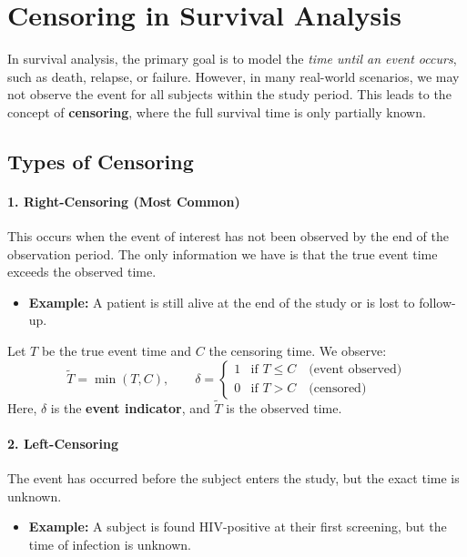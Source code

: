 \documentclass[12pt]{article}
\begin{document}
\section{Censoring in Survival Analysis}

In survival analysis, the primary goal is to model the \emph{time until an event occurs}, such as death, relapse, or failure. However, in many real-world scenarios, we may not observe the event for all subjects within the study period. This leads to the concept of \textbf{censoring}, where the full survival time is only partially known.

\subsection{Types of Censoring}

\paragraph{1. Right-Censoring (Most Common)}
This occurs when the event of interest has not been observed by the end of the observation period. The only information we have is that the true event time exceeds the observed time.

\begin{itemize}
  \item \textbf{Example:} A patient is still alive at the end of the study or is lost to follow-up.
\end{itemize}

Let $ T $ be the true event time and $ C $ the censoring time. We observe:
\begin{equation}
\tilde{T} = \min(T, C), \qquad \delta = 
\begin{cases}
1 & \text{if } T \leq C \quad \text{(event observed)} \\
0 & \text{if } T > C \quad \text{(censored)}
\end{cases}
\end{equation}
Here, $ \delta $ is the \textbf{event indicator}, and $ \tilde{T} $ is the observed time.

\paragraph{2. Left-Censoring}
The event has occurred before the subject enters the study, but the exact time is unknown.

\begin{itemize}
  \item \textbf{Example:} A subject is found HIV-positive at their first screening, but the time of infection is unknown.
\end{itemize}
\end{document}
